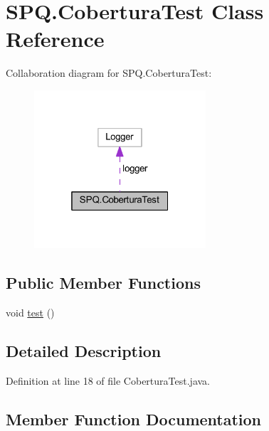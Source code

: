 \hypertarget{class_s_p_q_1_1_cobertura_test}{}\section{S\+P\+Q.\+Cobertura\+Test Class Reference}
\label{class_s_p_q_1_1_cobertura_test}


Collaboration diagram for S\+P\+Q.\+Cobertura\+Test\+:
\nopagebreak
\begin{figure}[H]
\begin{center}
\leavevmode
\includegraphics[width=181pt]{class_s_p_q_1_1_cobertura_test__coll__graph}
\end{center}
\end{figure}
\subsection*{Public Member Functions}
\begin{DoxyCompactItemize}
\item 
void \mbox{\hyperlink{class_s_p_q_1_1_cobertura_test_a638bd1485fb908cc3a97cda6f4d8a857}{test}} ()
\end{DoxyCompactItemize}


\subsection{Detailed Description}


Definition at line 18 of file Cobertura\+Test.\+java.



\subsection{Member Function Documentation}
\mbox{\label{class_s_p_q_1_1_cobertura_test_a638bd1485fb908cc3a97cda6f4d8a857}} 
